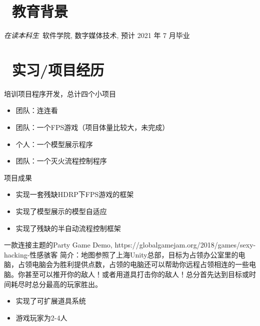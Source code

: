 \documentclass{resume}
\begin{document}


 
\section{\faGraduationCap\  教育背景}
\textit{在读本科生}\ 软件学院, 数字媒体技术, 预计 2021 年 7 月毕业

\section{\faUsers\ 实习/项目经历}
\role{企业项目实训}{游戏客户端研发}
\begin{onehalfspacing}
培训项目程序开发，总计四个小项目
\begin{itemize}
  \item 团队：连连看
  \item 团队：一个FPS游戏（项目体量比较大，未完成）
  \item 个人：一个模型展示程序
  \item 团队：一个灭火流程控制程序
\end{itemize}
项目成果
\begin{itemize}
  \item 实现一套残缺HDRP下FPS游戏的框架
  \item 实现了模型展示的模型自适应
  \item 实现了残缺的半自动流程控制框架
\end{itemize}
\end{onehalfspacing}

\begin{onehalfspacing}
一款连接主题的Party Game Demo, https://globalgamejam.org/2018/games/sexy-hacking-性感骇客
\newline
简介：地图参照了上海Unity总部，目标为占领办公室里的电脑，占领电脑会为胜利提供点数，占领的电脑还可以帮助你远程占领相连的一些电脑。你甚至可以推开你的敌人！或者用道具打击你的敌人！总分首先达到目标或时间耗尽时总分最高的玩家胜出。
\begin{itemize}
  \item 实现了可扩展道具系统
  \item 游戏玩家为2-4人
\end{itemize}
\end{onehalfspacing}
\end{document}
